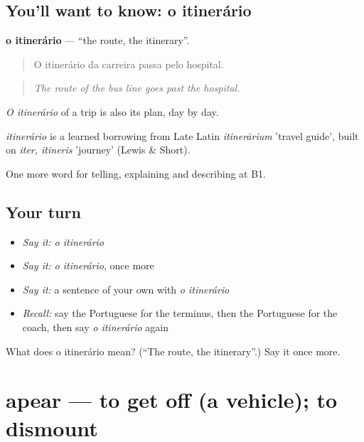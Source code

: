 \subsection*{You'll want to know: o itinerário}
\textbf{o itinerário} — \textquotedblleft{}the route, the itinerary\textquotedblright{}.

\begin{quote}
O itinerário da carreira passa pelo hospital.
\end{quote}

\begin{quote}
\emph{The route of the bus line goes past the hospital.}
\end{quote}

\emph{O itinerário} of a trip is also its plan, day by day.

\begin{cousinweb}
\emph{itinerário} is a learned borrowing from Late Latin \emph{itinerārium} 'travel guide', built on \emph{iter, itineris} 'journey' (Lewis \& Short).
\end{cousinweb}

\begin{grammarlens}[title={What you've built}]
One more word for telling, explaining and describing at B1.
\end{grammarlens}

\subsection*{Your turn}
\begin{itemize}
\raggedright
  \item \emph{Say it:} \emph{o itinerário}
  \item \emph{Say it:} \emph{o itinerário}, once more
  \item \emph{Say it:} a sentence of your own with \emph{o itinerário}
  \item \emph{Recall:} say the Portuguese for the terminus, then the Portuguese for the coach, then say \emph{o itinerário} again
\end{itemize}

\begin{tcolorbox}[breakable,colback=teal!4,colframe=teal!35!black,title={Before you move on}]
What does o itinerário mean? (\textquotedblleft{}The route, the itinerary\textquotedblright{}.) Say it once more.
\end{tcolorbox}
\section[apear]{apear — to get off (a vehicle); to dismount}

